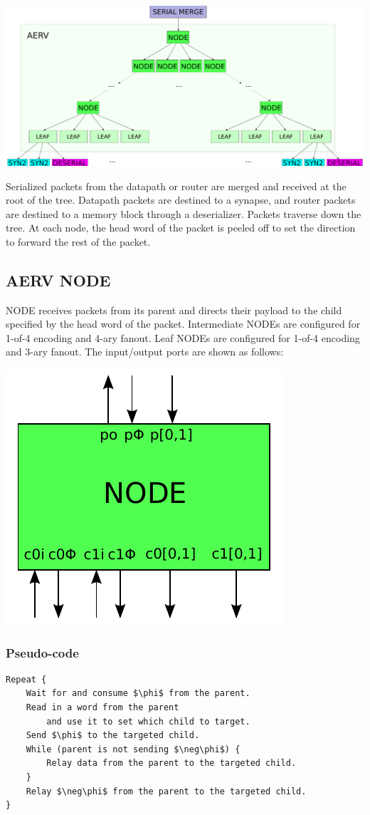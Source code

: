 \documentclass{article}
\begin{document}
\begin{center}
  \includegraphics[width=.8\textwidth]{img/aerv.pdf}
\end{center}
Serialized packets from the datapath or router are merged and received at the 
root of the tree.
Datapath packets are destined to a synapse, and router packets
are destined to a memory block through a deserializer. Packets
traverse down the tree. At each node, the head word of the packet is peeled
off to set the direction to forward the rest of the packet.

\subsection{AERV NODE \label{sec:AERV_NODE}}

NODE receives packets from its parent and directs their payload to the
child specified by the head word of the packet. Intermediate NODEs 
are configured for 1-of-4 encoding and 4-ary fanout. Leaf NODEs are configured
for 1-of-4 encoding and 3-ary fanout.
The input/output ports are shown as follows:

\begin{center}
  \includegraphics[width=.25\textwidth]{img/aerv_node.pdf}
\end{center}

\subsubsection*{Pseudo-code}

\begin{lstlisting}[mathescape]
Repeat {
    Wait for and consume $\phi$ from the parent.
    Read in a word from the parent
        and use it to set which child to target.
    Send $\phi$ to the targeted child.
    While (parent is not sending $\neg\phi$) {
        Relay data from the parent to the targeted child.
    }
    Relay $\neg\phi$ from the parent to the targeted child.
}
\end{lstlisting}
\end{document}
